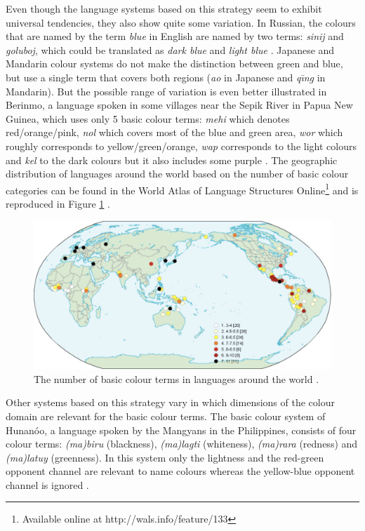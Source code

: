 Even though the language systems based on this strategy seem to
exhibit universal tendencies, they also show quite some
variation. In Russian, the colours that are named by the term \textit{blue}
in English are named by two terms: \textit{sinij} and \textit{goluboj}, which
could be translated as \textit{dark blue} and \textit{light blue}
\citep{safuanova07russian}. Japanese and Mandarin colour systems do
not make the distinction between green and blue, but use a single term
that covers both regions (\textit{ao} in Japanese and \textit{q\= \i ng} in
Mandarin). But the possible range of variation is even better
illustrated in Berinmo, a language spoken in some villages near the
Sepik River in Papua New Guinea, which uses only 5 basic colour terms:
\textit{mehi} which denotes red/orange/pink, \textit{nol} which covers most of
the blue and green area, \textit{wor} which roughly corresponds to
yellow/green/orange, \textit{wap} corresponds to the light colours and
\textit{kel} to the dark colours but it also includes some purple
\citep{roberson02color}. The geographic distribution of languages
around the world based on the number of basic colour categories can be
found in the World Atlas of Language Structures
Online\footnote{Available online at http://wals.info/feature/133} and
is reproduced in Figure \ref{f:number-bcts} \citep{kay08number}.

\begin{figure}[htbp]
  \begin{center}
    \includegraphics[width=\textwidth]{./intro/figures/number-bcts.pdf}
    \caption[The number of basic colour terms around the world]{The
      number of basic colour terms in languages around the world
      \citep{kay08number}.}
    \label{f:number-bcts}
  \end{center}
\end{figure}

Other systems based on this strategy vary in which dimensions of the
colour domain are relevant for the basic colour terms. The basic
colour system of Hunan\'oo, a language spoken by the Mangyans in the
Philippines, consists of four colour terms: \textit{(ma)biru} (blackness),
\textit{(ma)lagti} (whiteness), \textit{(ma)rara} (redness) and \textit{(ma)latuy}
(greenness). In this system only the lightness and the red-green
opponent channel are relevant to name colours whereas the yellow-blue
opponent channel is ignored \citep{conklin55hanunoo}.

